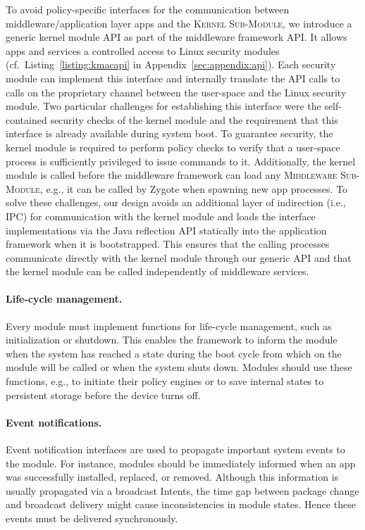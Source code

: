 \documentclass[letterpaper,twocolumn,10pt]{article}
\newcommand{\KMODULE}{\textsc{Kernel Sub-Module}\xspace}
\newcommand{\MMODULE}{\textsc{Middleware Sub-Module}\xspace}
\begin{document}
To avoid policy-specific interfaces for the communication between middleware/application layer apps and the \KMODULE, we introduce a generic kernel module API as part of the middleware framework API. It allows apps and services a controlled access to Linux security modules (cf.~Listing~\ref{listing:kmacapi} in Appendix~\ref{sec:appendix:api}). Each security module can implement this interface and internally translate the API calls to calls on the proprietary channel between the user-space and the Linux security module. Two particular challenges for establishing this interface were the self-contained security checks of the kernel module and the requirement that this interface is already available during system boot. To guarantee security, the kernel module is required to perform policy checks to verify that a user-space process is sufficiently privileged to issue commands to it. Additionally, the kernel module is called before the middleware framework can load any \MMODULE, e.g., it can be called by Zygote when spawning new app processes. To solve these challenges, our design avoids an additional layer of indirection (i.e., IPC) for communication with the kernel module and loads the interface implementations via the Java reflection API statically into the application framework when it is bootstrapped. This ensures that the calling processes communicate directly with the kernel module through our generic API and that the kernel module can be called independently of middleware services.


\paragraph{Life-cycle management.}

Every module must implement functions for life-cycle management, such as initialization or shutdown. This enables the framework to inform the module when the system has reached a state during the boot cycle from which on the module will be called or when the system shuts down. Modules should use these functions, e.g., to initiate their policy engines or to save internal states to persistent storage before the device turns off.

\paragraph{Event notifications.}

Event notification interfaces are used to propagate important system events to the module. For instance, modules should be immediately informed when an app was successfully installed, replaced, or removed. Although this information is usually propagated via a broadcast Intents, the time gap between package change and broadcast delivery might cause inconsistencies in module states. Hence these events must be delivered synchronously.
\end{document}
